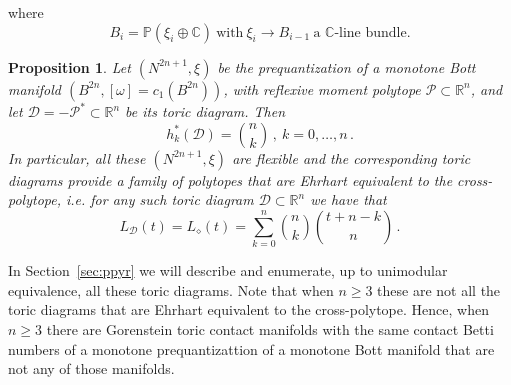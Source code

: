 \documentclass[a4paper,11pt,reqno]{amsart}
\newcommand{\R}{\mathbb R}
\newcommand{\C}{\mathbb C}
\newcommand{\CP}{\mathbb P}
\newcommand{\Dd}{{\mathcal D}}
\newcommand{\Pp}{{\mathcal P}}
\newtheorem{proposition}[theorem]{Proposition}
\begin{document}
where
\[
B_i = \CP (\xi_i \oplus \C) \ \text{with}\ \xi_{i} \rightarrow B_{i-1}\ \text{a $\C$-line bundle.}
\]
\begin{proposition} \label{prop:FanoBott}
Let $(N^{2n+1}, \xi)$ be the prequantization of a monotone Bott manifold $(B^{2n}, [\omega] = c_1 (B^{2n}))$,  with
reflexive moment polytope $\Pp\subset\R^n$, and let $\Dd=-\Pp^\ast \subset \R^n$ be its toric diagram. Then
\[
h^\ast_k (\Dd) = \binom{n}{k}\,,\ k=0,\ldots,n\,.
\]
In particular, all these $(N^{2n+1}, \xi)$ are flexible and the corresponding toric diagrams provide a family of polytopes that are 
Ehrhart equivalent to the cross-polytope, i.e. for any such toric diagram $\Dd\subset\R^n$ we have that
\[
L_\Dd (t) = L_\diamond (t) = \sum_{k=0}^n \binom{n}{k} \binom{t+n-k}{n}\,.
\]
\end{proposition}
\noindent In Section~\ref{sec:ppyr} we will describe and enumerate, up to unimodular equivalence, all these 
toric diagrams. Note that when $n\geq 3$ these are not all the toric diagrams that are Ehrhart equivalent
to the cross-polytope. Hence, when $n\geq 3$ there are Gorenstein toric contact manifolds with the same 
contact Betti numbers of a monotone prequantizattion of a monotone Bott manifold that are not any of those 
manifolds. 
\end{document}
